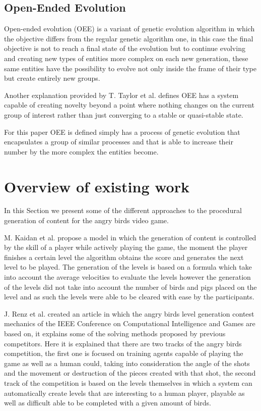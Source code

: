 \documentclass[graybox]{svmult}
\begin{document}
\subsection{Open-Ended Evolution}

Open-ended evolution (OEE) is a variant of genetic evolution algorithm in which the objective differs from the regular genetic algorithm one, in this case the final objective is not to reach a final state of the evolution but to continue evolving and creating new types of entities more complex on each new generation, these same entities have the possibility to evolve not only inside the frame of their type but create entirely new groups. \cite{Standish2003}

Another explanation provided by T. Taylor et al. \cite{Taylor2016, Taylor} defines OEE has a system capable of creating novelty beyond a point where nothing changes on the current group of interest rather than just converging to a stable or quasi-stable state.

For this paper OEE is defined simply has a process of genetic evolution that encapsulates a group of similar processes and that is able to increase their number by the more complex the entities become.

\section{Overview of existing work}

In this Section we present some of the different approaches to the procedural generation of content for the angry birds video game.

M. Kaidan et al. \cite{Kaidan2015} propose a model in which the generation of content is controlled by the skill of a player while actively playing the game, the moment the player finishes a certain level the algorithm obtains the score and generates the next level to be played. The generation of the levels is based on a formula which take into account the average velocities to evaluate the levels however the generation of the levels did not take into account the number of birds and pigs placed on the level and as such the levels were able to be cleared with ease by the participants. 

J. Renz et al. \cite{Renz} created an article in which the angry birds level generation contest mechanics of the IEEE Conference on Computational Intelligence and Games are based on, it explains some of the solving methods proposed by previous competitors. Here it is explained that there are two tracks of the angry birds competition, the first one is focused on training agents capable of playing the game as well as a human could, taking into consideration the angle of the shots and the movement or destruction of the pieces created with that shot, the second track of the competition is based on the levels themselves in which a system can automatically create levels that are interesting to a human player, playable as well as difficult able to be completed with a given amount of birds.
\end{document}
